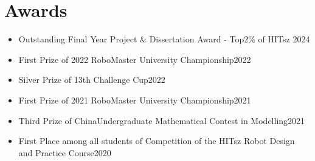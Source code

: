 \documentclass[11pt,a4paper]{moderncv}        %
\begin{document}
\section{Awards}
\begin{itemize}%
    \item Outstanding Final Year Project \& Dissertation Award - Top2\% of HITsz \hfill 2024
    \item First Prize of 2022 RoboMaster University Championship\hfill 2022
    \item Silver Prize of 13th  Challenge Cup\hfill 2022
    \item First Prize of 2021 RoboMaster University Championship\hfill 2021
    \item Third Prize of ChinaUndergraduate Mathematical Contest in Modelling\hfill 2021
    \item First Place among all students of Competition of the HITsz Robot Design and Practice Course\hfill 2020
\end{itemize}

\end{document}
